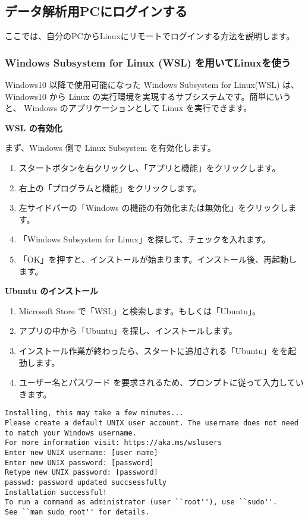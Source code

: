 
\subsection{データ解析用PCにログインする}
ここでは、自分のPCからLinuxにリモートでログインする方法を説明します。

\subsubsection{Windows Subsystem for Linux (WSL) を用いてLinuxを使う}
Windows10 以降で使用可能になった Windows Subsystem for Linux(WSL) は、 Windows10 から Linux の実行環境を実現するサブシステムです。簡単にいうと、 Windows のアプリケーションとして Linux を実行できます。

\vspace{1cm}
{\large \bf WSL の有効化}
\vspace{0.5cm}

まず、Windows 側で Linux Subsystem を有効化します。
\begin{enumerate}
  \item スタートボタンを右クリックし、「アプリと機能」をクリックします。
  \item 右上の「プログラムと機能」をクリックします。
  \item 左サイドバーの「Windows の機能の有効化または無効化」をクリックします。
  \item 「Windows Subsystem for Linux」を探して、チェックを入れます。
  \item 「OK」を押すと、インストールが始まります。インストール後、再起動します。
\end{enumerate}

\vspace{1cm}
{\large \bf Ubuntu のインストール}
\vspace{0.5cm}

\begin{enumerate}
  \item Microsoft Store で「WSL」と検索します。もしくは「Ubuntu」。
  \item アプリの中から「Ubuntu」を探し、インストールします。
  \item インストール作業が終わったら、スタートに追加される「Ubuntu」をを起動します。
  \item ユーザー名とパスワード を要求されるため、プロンプトに従って入力していきます。
\end{enumerate}
\begin{lstlisting}[caption=表示されるスクリプト例]
Installing, this may take a few minutes...
Please create a default UNIX user account. The username does not need to match your Windows username.
For more information visit: https://aka.ms/wslusers
Enter new UNIX username: [user name]
Enter new UNIX password: [password]
Retype new UNIX password: [password]
passwd: password updated succsessfully
Installation successful!
To run a command as administrator (user ``root''), use ``sudo''.
See ``man sudo_root'' for details.
\end{lstlisting}

